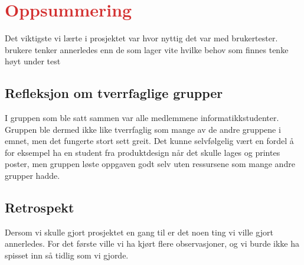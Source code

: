 \section{\textcolor[HTML]{D32F2F}{Oppsummering}}
Det viktigste vi lærte i prosjektet var hvor nyttig det var med brukertester.
brukere tenker annerledes enn de som lager
vite hvilke behov som finnes
tenke høyt under test


\subsection{Refleksjon om tverrfaglige grupper}
I gruppen som ble satt sammen var alle medlemmene informatikkstudenter. Gruppen ble dermed ikke like tverrfaglig som mange av de andre gruppene i emnet, men det fungerte stort sett greit. Det kunne selvfølgelig vært en fordel å for eksempel ha en student fra produktdesign når det skulle lages og printes poster, men gruppen løste oppgaven godt selv uten ressursene som mange andre grupper hadde.

\subsection{Retrospekt}
Dersom vi skulle gjort prosjektet en gang til er det noen ting vi ville gjort annerledes. For det første ville vi ha kjørt flere observasjoner, og vi burde ikke ha spisset inn så tidlig som vi gjorde.

